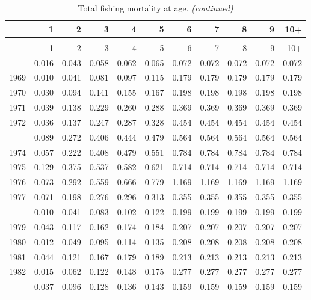 \documentclass[
]{article}
\begin{document}
\begin{longtable}[t]{lrrrrrrrrrr}
\caption{\label{tab:FAA-tot-table}Total fishing mortality at age.}\\
\toprule
  & 1 & 2 & 3 & 4 & 5 & 6 & 7 & 8 & 9 & 10+\\
\midrule
\endfirsthead
\caption[]{Total fishing mortality at age. \textit{(continued)}}\\
\toprule
  & 1 & 2 & 3 & 4 & 5 & 6 & 7 & 8 & 9 & 10+\\
\midrule
\endhead

\endfoot
\bottomrule
\endlastfoot
1968 & 0.016 & 0.043 & 0.058 & 0.062 & 0.065 & 0.072 & 0.072 & 0.072 & 0.072 & 0.072\\
1969 & 0.010 & 0.041 & 0.081 & 0.097 & 0.115 & 0.179 & 0.179 & 0.179 & 0.179 & 0.179\\
1970 & 0.030 & 0.094 & 0.141 & 0.155 & 0.167 & 0.198 & 0.198 & 0.198 & 0.198 & 0.198\\
1971 & 0.039 & 0.138 & 0.229 & 0.260 & 0.288 & 0.369 & 0.369 & 0.369 & 0.369 & 0.369\\
1972 & 0.036 & 0.137 & 0.247 & 0.287 & 0.328 & 0.454 & 0.454 & 0.454 & 0.454 & 0.454\\
\addlinespace
1973 & 0.089 & 0.272 & 0.406 & 0.444 & 0.479 & 0.564 & 0.564 & 0.564 & 0.564 & 0.564\\
1974 & 0.057 & 0.222 & 0.408 & 0.479 & 0.551 & 0.784 & 0.784 & 0.784 & 0.784 & 0.784\\
1975 & 0.129 & 0.375 & 0.537 & 0.582 & 0.621 & 0.714 & 0.714 & 0.714 & 0.714 & 0.714\\
1976 & 0.073 & 0.292 & 0.559 & 0.666 & 0.779 & 1.169 & 1.169 & 1.169 & 1.169 & 1.169\\
1977 & 0.071 & 0.198 & 0.276 & 0.296 & 0.313 & 0.355 & 0.355 & 0.355 & 0.355 & 0.355\\
\addlinespace
1978 & 0.010 & 0.041 & 0.083 & 0.102 & 0.122 & 0.199 & 0.199 & 0.199 & 0.199 & 0.199\\
1979 & 0.043 & 0.117 & 0.162 & 0.174 & 0.184 & 0.207 & 0.207 & 0.207 & 0.207 & 0.207\\
1980 & 0.012 & 0.049 & 0.095 & 0.114 & 0.135 & 0.208 & 0.208 & 0.208 & 0.208 & 0.208\\
1981 & 0.044 & 0.121 & 0.167 & 0.179 & 0.189 & 0.213 & 0.213 & 0.213 & 0.213 & 0.213\\
1982 & 0.015 & 0.062 & 0.122 & 0.148 & 0.175 & 0.277 & 0.277 & 0.277 & 0.277 & 0.277\\
\addlinespace
1983 & 0.037 & 0.096 & 0.128 & 0.136 & 0.143 & 0.159 & 0.159 & 0.159 & 0.159 & 0.159\\

\end{longtable}
\end{document}

